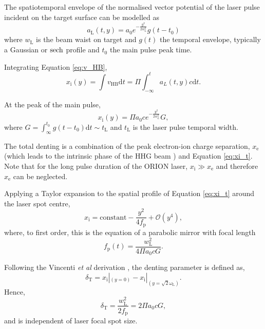 The spatiotemporal envelope of the normalised vector potential of the laser pulse incident on the target surface can be modelled as
\begin{equation}
	a_\mathrm{L}(t,y) = a_0e^{-\frac{y^2}{2w_\mathrm{L}^2}}g(t-t_0)
\end{equation}
where $w_\mathrm{L}$ is the beam waist on target and $g(t)$ the temporal envelope, typically a Gaussian or $\operatorname{sech}$ profile and $t_0$ the main pulse peak time.

Integrating Equation \ref{eq:v_HB},
\begin{equation}\label{eq:xi_t}
	x_\mathrm{i}(y) = \int v_\mathrm{HB}\mathrm{d}t = \Pi \int^t_{-\infty} a_L(t,y)c\mathrm{d}t.
\end{equation}

At the peak of the main pulse,
\begin{equation}
	x_\mathrm{i}(y) = \Pi a_0ce^{-\frac{y^2}{2w_L^2}} G,
\end{equation}
where $G = \int_\infty^{t_0} g(t-t_0) \mathrm{d} t \sim t_\mathrm{L}$ and $t_\mathrm{L}$ is the laser pulse temporal width.

The total denting is a combination of the peak electron-ion charge separation, $x_\mathrm{e}$ (which leads to the intrinsic phase of the HHG beam \cite{anderbruggePropagationRelativisticSurface2007}) and Equation \ref{eq:xi_t}. Note that for the long pulse duration of the ORION laser, $x_\mathrm{i} \gg x_\mathrm{e}$ and therefore $x_\mathrm{e}$ can be neglected.

Applying a Taylor expansion to the spatial profile of Equation \ref{eq:xi_t} around the laser spot centre,
\begin{equation}
	x_\mathrm{i} = \mathrm{constant} - \frac{y^2}{4f_\mathrm{p}} + \mathcal{O}(y^4),
\end{equation}
where, to first order, this is the equation of a parabolic mirror with focal length
\begin{equation}
	f_\mathrm{p}(t) = \frac{w_\mathrm{L}^2}{4\Pi a_0cG}.
\end{equation}

Following the Vincenti \textit{et al} derivation \cite{vincentiOpticalPropertiesRelativistic2014}, the denting parameter is defined as,
\begin{equation}
	\delta_\mathrm{T} =  x_\mathrm{i}|_{(y=0)} - x_\mathrm{i}|_{(y=\sqrt{2}\omega_\mathrm{L})}.
\end{equation}
Hence,
\begin{equation}
	\delta_\mathrm{T} = \frac{w_\mathrm{L}^2}{2f_\mathrm{p}} = 2\Pi a_0 c G,
\end{equation}
and is independent of laser focal spot size. 

